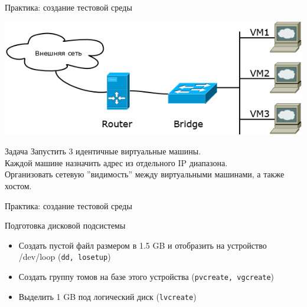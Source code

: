 \begin{frame}{Практика: создание тестовой среды}

	\center\includegraphics[height=0.4\textheight]{../../slides/networking/net-practice.png}


	\begin{block}{Задача}
		Запустить 3 идентичные виртуальные машины.\\
		Каждой машине назначить адрес из отдельного IP диапазона.\\
		Организовать сетевую ''видимость'' между виртуальными машинами, а также хостом.		
	\end{block}

\end{frame}



\begin{frame}{Практика: создание тестовой среды}
	\begin{block}{Подготовка дисковой подсистемы}
			\begin{itemize}
				\item Создать пустой файл размером в 1.5 GB и отобразить на устройство
					/dev/loop ({\tt dd, losetup})
				\item Создать группу томов на базе этого устройства ({\tt pvcreate, vgcreate})
				\item Выделить 1 GB под логический диск ({\tt lvcreate})
			\end{itemize}
	\end{block}
\end{frame}

